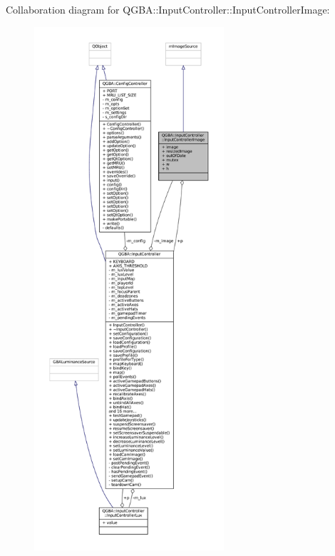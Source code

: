 Collaboration diagram for Q\+G\+BA\+:\+:Input\+Controller\+:\+:Input\+Controller\+Image\+:
\nopagebreak
\begin{figure}[H]
\begin{center}
\leavevmode
\includegraphics[height=550pt]{struct_q_g_b_a_1_1_input_controller_1_1_input_controller_image__coll__graph}
\end{center}
\end{figure}

